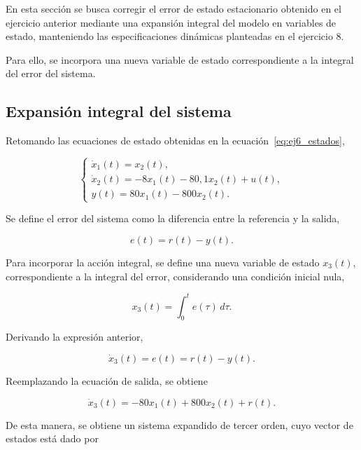 \documentclass[10pt]{article}
\begin{document}
En esta sección se busca corregir el error de estado
estacionario obtenido en el ejercicio anterior mediante
una expansión integral del modelo en variables de estado,
manteniendo las especificaciones dinámicas planteadas
en el ejercicio 8.

Para ello, se incorpora una nueva variable de estado
correspondiente a la integral del error del sistema.


\subsection{Expansión integral del sistema}

Retomando las ecuaciones de estado obtenidas en la
ecuación~\eqref{eq:ej6_estados},

\begin{equation}
    \begin{cases}
        \dot{x}_1(t)=x_2(t),\\
        \dot{x}_2(t)=-8x_1(t)-80{,}1x_2(t)+u(t),\\
        y(t)=80x_1(t)-800x_2(t).
    \end{cases}
\end{equation}

Se define el error del sistema como la diferencia
entre la referencia y la salida,

\begin{equation}
    e(t)=r(t)-y(t).
\end{equation}

Para incorporar la acción integral, se define una
nueva variable de estado $x_3(t)$, correspondiente
a la integral del error, considerando una condición
inicial nula,

\begin{equation}
    x_3(t)=\int_0^t e(\tau)\,d\tau.
\end{equation}

Derivando la expresión anterior,

\begin{equation}
    \dot{x}_3(t)=e(t)=r(t)-y(t).
\end{equation}

Reemplazando la ecuación de salida, se obtiene

\begin{equation}
    \dot{x}_3(t)=
    -80x_1(t)+800x_2(t)+r(t).
\end{equation}

De esta manera, se obtiene un sistema expandido de
tercer orden, cuyo vector de estados está dado por
\end{document}

